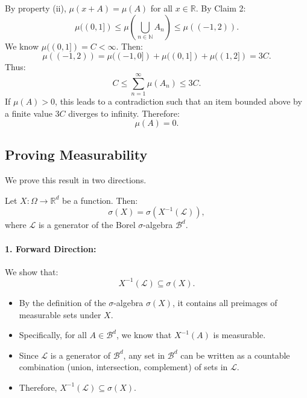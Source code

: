\begin{prf}
\begin{prf*}
By property (ii), \( \mu(x + A) = \mu(A) \) for all \( x \in \mathbb{R} \). By Claim 2:
\[
\mu((0, 1]) \leq \mu\left(\bigcup_{n \in \mathbb{N}} A_n\right) \leq \mu((-1, 2)).
\]
We know \(\mu((0, 1]) = C < \infty\). Then:
\[
\mu((-1, 2)) = \mu((-1, 0]) + \mu((0, 1]) + \mu((1, 2]) = 3C.
\]
Thus:
\[
C \leq \sum_{n=1}^\infty \mu(A_n) \leq 3C.
\]
If \( \mu(A) > 0 \), this leads to a contradiction such that an item bounded above by a finite value $3C$ diverges to infinity. Therefore:
\[
\mu(A) = 0.
\]

\end{prf*}


\subsection{Proving Measurability}
\label{proof: measurability}

\begin{prf}
We prove this result in two directions.

Let \(X: \Omega \to \mathbb{R}^d\) be a function. Then:
\[
\sigma(X) = \sigma\left(X^{-1}(\mathcal{L})\right),
\]
where \(\mathcal{L}\) is a generator of the Borel \(\sigma\)-algebra \(\mathscr{B}^d\).

\paragraph{1. Forward Direction:}  
We show that:
\[
X^{-1}(\mathcal{L}) \subseteq \sigma(X).
\]
\begin{itemize}
    \item By the definition of the \(\sigma\)-algebra \(\sigma(X)\), it contains all preimages of measurable sets under \(X\).
    \item Specifically, for all \(A \in \mathscr{B}^d\), we know that \(X^{-1}(A)\) is measurable.
    \item Since \(\mathcal{L}\) is a generator of \(\mathscr{B}^d\), any set in \(\mathscr{B}^d\) can be written as a countable combination (union, intersection, complement) of sets in \(\mathcal{L}\).
    \item Therefore, \(X^{-1}(\mathcal{L}) \subseteq \sigma(X)\).
\end{itemize}


\end{prf}
\end{prf}
